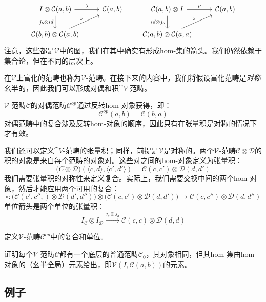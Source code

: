 \documentclass[DaoFP]{subfiles}
\begin{document}
\[
 \begin{tikzcd}
 I \otimes \mathcal C(a, b)
 \arrow[r, "\lambda"]
 \arrow[d, "j_b \otimes id"']
 & \mathcal C(a, b)
 \\
 \mathcal C(b, b) \otimes \mathcal C(a, b)
 \arrow[ru, "\circ"]
 \end{tikzcd}
 \qquad
\begin{tikzcd}
\mathcal C(a, b) \otimes I
\arrow[r, "\rho"]
\arrow[d, "id \otimes j_a"']
& \mathcal C(a, b)
\\
\mathcal C(a, b) \otimes \mathcal C(a, a)
\arrow[ru, "\circ"]
 \end{tikzcd}
\]
注意，这些都是$\mathcal V$中的图，我们在其中确实有形成hom-集的箭头。我们仍然依赖于集合论，但在不同的层次上。

在$\mathcal V$上富化的范畴也称为$\mathcal V$-范畴。在接下来的内容中，我们将假设富化范畴是\emph{对称}幺半的，因此我们可以形成对偶和积$\cat V$-范畴。

$\mathcal V$-范畴$\mathcal C$的对偶范畴$\mathcal C^{op}$通过反转hom-对象获得，即：
\[ \mathcal C^{op}(a, b) = \mathcal C(b, a) \]
对偶范畴中的复合涉及反转hom-对象的顺序，因此只有在张量积是对称的情况下才有效。

我们还可以定义$\cat V$-范畴的张量积；同样，前提是$\mathcal V$是对称的。两个$\mathcal V$-范畴$\mathcal C \otimes \mathcal D$的积的对象是来自每个范畴的对象对。这些对之间的hom-对象定义为张量积：
\[ \mathcal (C \otimes \mathcal D) (\langle c, d \rangle, \langle c', d' \rangle) = \mathcal C(c, c') \otimes \mathcal D (d, d') \]
我们需要张量积的对称性来定义复合。实际上，我们需要交换中间的两个hom-对象，然后才能应用两个可用的复合：
\[ \circ \colon  \big(\mathcal C(c', c'',) \otimes \mathcal D (d', d'')\big) \otimes \big( \mathcal C(c, c') \otimes \mathcal D (d, d')\big) \to  \mathcal C(c, c'') \otimes \mathcal D (d, d'') \]
单位箭头是两个单位的张量积：
\[ I_{\mathcal C} \otimes I_{\mathcal D} \xrightarrow{j_c \otimes j_d} \mathcal C(c, c) \otimes \mathcal D (d, d) \]


\begin{exercise}
定义$\mathcal V$-范畴$\mathcal C^{op}$中的复合和单位。
\end{exercise}

\begin{exercise}
证明每个$\mathcal V$-范畴$\mathcal C$都有一个底层的普通范畴$\mathcal C_0$，其对象相同，但其hom-集由hom-对象的（幺半全局）元素给出，即$\mathcal V(I, \mathcal C(a, b))$的元素。
\end{exercise}

\subsection{例子}
\end{document}
